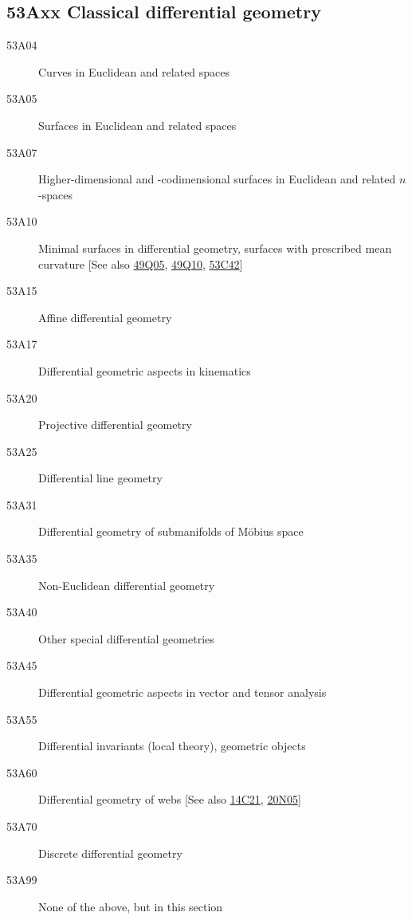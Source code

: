 \documentclass[letterpaper]{article}
\begin{document}
\subsection*{53Axx  Classical differential geometry }\label{53Axx}
\begin{description} 
\item [53A04]\label{53A04} Curves in Euclidean and related spaces
\item [53A05]\label{53A05} Surfaces in Euclidean and related spaces
\item [53A07]\label{53A07} Higher-dimensional and -codimensional surfaces in Euclidean and related $n$-spaces
\item [53A10]\label{53A10} Minimal surfaces in differential geometry, surfaces with prescribed mean curvature [See also \hyperref[49Q05]{49Q05}, \hyperref[49Q10]{49Q10}, \hyperref[53C42]{53C42}]
\item [53A15]\label{53A15} Affine differential geometry
\item [53A17]\label{53A17} Differential geometric aspects in kinematics
\item [53A20]\label{53A20} Projective differential geometry
\item [53A25]\label{53A25} Differential line geometry
\item [53A31]\label{53A31} Differential geometry of submanifolds of M\"obius space
\item [53A35]\label{53A35} Non-Euclidean differential geometry
\item [53A40]\label{53A40} Other special differential geometries
\item [53A45]\label{53A45} Differential geometric aspects in vector and tensor analysis
\item [53A55]\label{53A55} Differential invariants (local theory), geometric objects
\item [53A60]\label{53A60} Differential geometry of webs [See also \hyperref[14C21]{14C21}, \hyperref[20N05]{20N05}]
\item [53A70]\label{53A70} Discrete differential geometry
\item [53A99]\label{53A99} None of the above, but in this section
\end{description}
\end{document}
